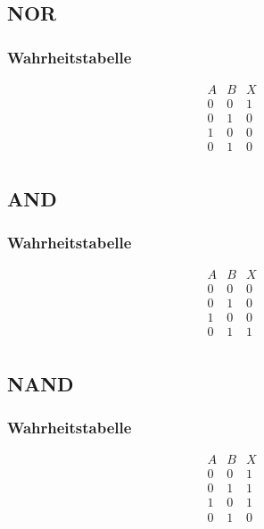 \subsection{NOR}
\subsubsection{Wahrheitstabelle}
\begin{table}[h!]
\[ \begin{array}{cc|c}
A&B&X\\
\hline
0&0&1\\
0&1&0\\
1&0&0\\
0&1&0\\
\end{array} \]
\end{table}

\subsection{AND}
\subsubsection{Wahrheitstabelle}
\begin{table}[h!]
\[ \begin{array}{cc|c}
A&B&X\\
\hline
0&0&0\\
0&1&0\\
1&0&0\\
0&1&1\\
\end{array} \]
\end{table}

\subsection{NAND}
\subsubsection{Wahrheitstabelle}
\begin{table}[h!]
\[ \begin{array}{cc|c}
A&B&X\\
\hline
0&0&1\\
0&1&1\\
1&0&1\\
0&1&0\\
\end{array} \]
\end{table}

